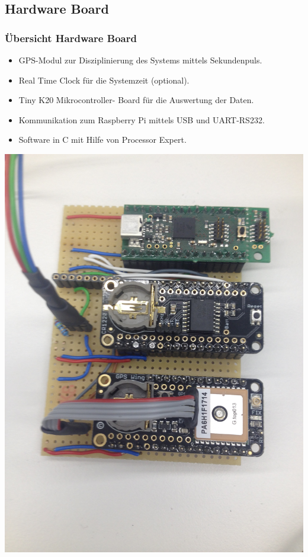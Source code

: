 \subsection{Hardware Board}
\begin{frame}
	\frametitle{Übersicht Hardware Board}
	\begin{minipage}{0.45\textwidth}
		\begin{itemize}
			\item GPS-Modul zur Disziplinierung des Systems mittels Sekundenpuls.
			\item Real Time Clock für die Systemzeit (optional).
			\item Tiny K20 Mikrocontroller- Board für die Auswertung der Daten.
			\item Kommunikation zum Raspberry Pi mittels USB und UART-RS232.
			\item Software in C mit Hilfe von Processor Expert.
		\end{itemize}
	\end{minipage}
	\begin{minipage}{0.45\textwidth}
		\centering
		\includegraphics[width=\textwidth]{../docs/images/HW_Board_Complete}
	\end{minipage}
\end{frame}


